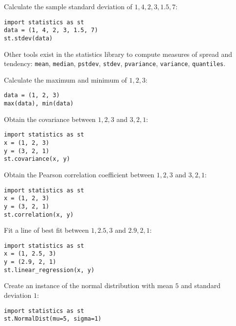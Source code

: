 \documentclass{article}
\begin{document}
\begin{multicols}{2}

    Calculate the sample standard deviation of $1, 4, 2, 3, 1.5, 7$:

        \begin{verbatim}
import statistics as st
data = (1, 4, 2, 3, 1.5, 7)
st.stdev(data)
\end{verbatim}

Other tools exist in the statistics library to compute measures of spread and
tendency: \texttt{mean}, \texttt{median},
    \texttt{pstdev}, \texttt{stdev},
    \texttt{pvariance}, \texttt{variance},
    \texttt{quantiles}.

    Calculate the maximum and minimum of $1, 2, 3$:

        \begin{verbatim}
data = (1, 2, 3)
max(data), min(data)
\end{verbatim}

    Obtain the covariance between $1, 2, 3$ and $3, 2, 1$:

        \begin{verbatim}
import statistics as st
x = (1, 2, 3)
y = (3, 2, 1)
st.covariance(x, y)
\end{verbatim}

    Obtain the Pearson correlation coefficient between $1, 2, 3$ and $3, 2, 1$:

        \begin{verbatim}
import statistics as st
x = (1, 2, 3)
y = (3, 2, 1)
st.correlation(x, y)
\end{verbatim}

    Fit a line of best fit between $1, 2.5, 3$ and $2.9, 2, 1$:

        \begin{verbatim}
import statistics as st
x = (1, 2.5, 3)
y = (2.9, 2, 1)
st.linear_regression(x, y)
\end{verbatim}

    Create an instance of the normal distribution with mean $5$ and standard
    deviation $1$:

        \begin{verbatim}
import statistics as st
st.NormalDist(mu=5, sigma=1)
\end{verbatim}

\end{multicols}
\end{document}
